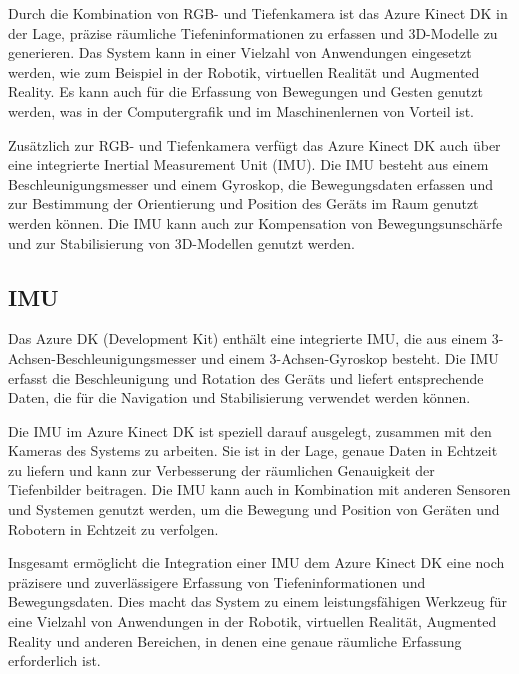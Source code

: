    

    Durch die Kombination von RGB- und Tiefenkamera ist das Azure Kinect \ac{DK} in der Lage, präzise räumliche Tiefeninformationen zu erfassen und 3D-Modelle zu generieren. Das System kann in einer Vielzahl von Anwendungen eingesetzt werden, wie zum Beispiel in der Robotik, virtuellen Realität und Augmented Reality. Es kann auch für die Erfassung von Bewegungen und Gesten genutzt werden, was in der Computergrafik und im Maschinenlernen von Vorteil ist.


    Zusätzlich zur RGB- und Tiefenkamera verfügt das Azure Kinect \ac{DK} auch über eine integrierte Inertial Measurement Unit (\ac{IMU}). Die \ac{IMU} besteht aus einem Beschleunigungsmesser und einem Gyroskop, die Bewegungsdaten erfassen und zur Bestimmung der Orientierung und Position des Geräts im Raum genutzt werden können. Die \ac{IMU} kann auch zur Kompensation von Bewegungsunschärfe und zur Stabilisierung von 3D-Modellen genutzt werden.

\subsection{\acl{IMU}}

Das Azure DK (Development Kit) enthält eine integrierte \ac{IMU}, die aus einem 3-Achsen-Beschleunigungsmesser und einem 3-Achsen-Gyroskop besteht. Die \ac{IMU} erfasst die Beschleunigung und Rotation des Geräts und liefert entsprechende Daten, die für die Navigation und Stabilisierung verwendet werden können.

Die \ac{IMU} im Azure Kinect \ac{DK} ist speziell darauf ausgelegt, zusammen mit den Kameras des Systems zu arbeiten. Sie ist in der Lage, genaue Daten in Echtzeit zu liefern und kann zur Verbesserung der räumlichen Genauigkeit der Tiefenbilder beitragen. Die \ac{IMU} kann auch in Kombination mit anderen Sensoren und Systemen genutzt werden, um die Bewegung und Position von Geräten und Robotern in Echtzeit zu verfolgen.


Insgesamt ermöglicht die Integration einer \ac{IMU} dem Azure Kinect \ac{DK} eine noch präzisere und zuverlässigere Erfassung von Tiefeninformationen und Bewegungsdaten. Dies macht das System zu einem leistungsfähigen Werkzeug für eine Vielzahl von Anwendungen in der Robotik, virtuellen Realität, Augmented Reality und anderen Bereichen, in denen eine genaue räumliche Erfassung erforderlich ist.

